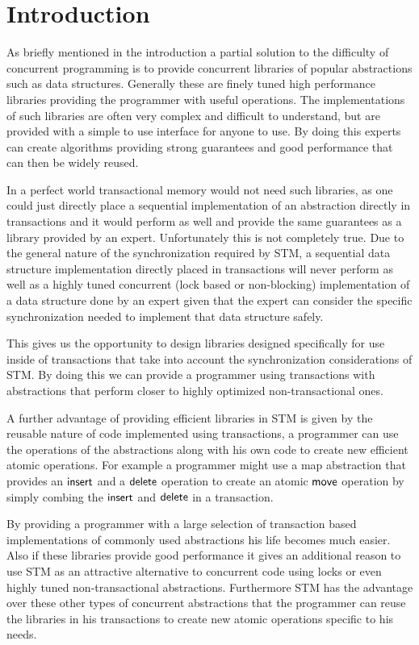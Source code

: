 \section{Introduction}

As briefly mentioned in the introduction a partial solution to the difficulty of concurrent programming
is to provide concurrent libraries of popular abstractions such as data structures.
Generally these are finely tuned high performance libraries
providing the programmer with useful operations.
The implementations of such libraries are often very complex
and difficult to understand, but are provided with a simple to use
interface for anyone to use.
By doing this experts can create algorithms providing strong guarantees
and good performance that can then be widely reused.

In a perfect world transactional memory would not need such libraries,
as one could just directly place a sequential implementation of an abstraction
directly in transactions and it would perform as well and provide the same
guarantees as a library provided by an expert.
Unfortunately this is not completely true.
Due to the general nature
of the synchronization required by STM, a sequential data structure implementation directly
placed in transactions will never perform as well as a highly tuned concurrent
(lock based or non-blocking) implementation of a data structure done by an expert
given that the expert can consider the specific synchronization needed to implement
that data structure safely.

This gives us the opportunity to design libraries designed specifically for use inside
of transactions that take into account the synchronization considerations
of STM.
By doing this we can provide a programmer using transactions with abstractions that perform closer
to highly optimized non-transactional ones.

A further advantage of providing efficient libraries in STM is given by the reusable nature of code implemented using
transactions, a programmer can use the operations of the abstractions along with his own code
to create new efficient atomic operations.
For example a programmer might use a map abstraction that provides an $\lit{insert}$ and a $\lit{delete}$ operation
to create an atomic $\lit{move}$ operation by simply combing the $\lit{insert}$ and $\lit{delete}$ in a transaction.

By providing a programmer with a large selection of transaction based implementations of commonly used abstractions
his life becomes much easier.
Also if these libraries provide good performance it gives an additional reason to use STM as an attractive alternative to
concurrent code using locks or even highly tuned non-transactional abstractions.
Furthermore STM has the advantage over these other types of concurrent abstractions that the programmer can reuse
the libraries in his transactions to create new atomic operations specific to his needs.

